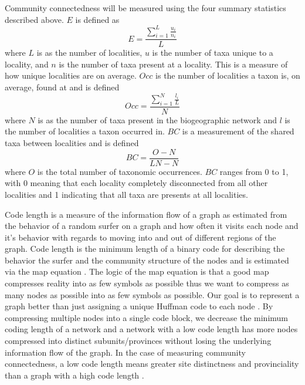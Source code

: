\documentclass[12pt,letterpaper]{article}
\begin{document}
Community connectedness will be measured using the four summary statistics described above. \(E\) is defined as 
\begin{equation}
  E = \frac{\sum_{i = 1}^{L} \frac{u_{i}}{n_{i}}}{L}
  \label{eq:e}
\end{equation}
where \(L\) is as the number of localities, \(u\) is the number of taxa unique to a locality, and \(n\) is the number of taxa present at a locality. This is a measure of how unique localities are on average. \(Occ\) is the number of localities a taxon is, on average, found at and is defined
\begin{equation}
  Occ = \frac{\sum_{i = 1}^{N} \frac{l_{i}}{L}}{N}
  \label{eq:occ}
\end{equation}
where \(N\) is as the number of taxa present in the biogeographic network and \(l\) is the number of localities a taxon occurred in. \(BC\) is a measurement of the shared taxa between localities and is defined 
\begin{equation}
  BC = \frac{O - N}{LN - N}
  \label{eq:bc}
\end{equation}
where \(O\) is the total number of taxonomic occurrences. \(BC\) ranges from 0 to 1, with 0 meaning that each locality completely disconnected from all other localities and 1 indicating that all taxa are presents at all localities. 

Code length is a measure of the information flow \citep{Shannon1948} of a graph as estimated from the behavior of a random surfer \citep{Brin1998} on a graph and how often it visits each node and it's behavior with regards to moving into and out of different regions of the graph. Code length is the minimum length of a binary code for describing the behavior the surfer and the community structure of the nodes and is estimated via the map equation \citep{Rosvall2008,Rosvall2009a}. The logic of the map equation is that a good map compresses reality into as few symbols as possible thus we want to compress as many nodes as possible into as few symbols as possible. Our goal is to represent a graph better than just assigning a unique Huffman code to each node \citep{Huffman1952,Rosvall2008}. By compressing multiple nodes into a single code block, we decrease the minimum coding length of a network and a network with a low code length has more nodes compressed into distinct subunits/provinces without losing the underlying information flow of the graph. In the case of measuring community connectedness, a low code length means greater site distinctness and provinciality than a graph with a high code length \citep{Sidor2013}. 
\end{document}
